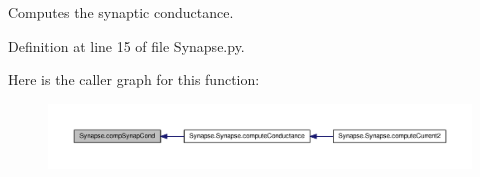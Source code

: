 Computes the synaptic conductance. 



Definition at line 15 of file Synapse.\-py.



Here is the caller graph for this function\-:\nopagebreak
\begin{figure}[H]
\begin{center}
\leavevmode
\includegraphics[width=350pt]{namespace_synapse_a55ffd471fbed3550b464a9862687f541_icgraph}
\end{center}
\end{figure}


